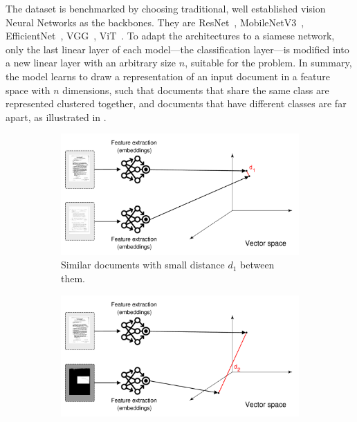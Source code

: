 The dataset is benchmarked by choosing traditional, well established vision Neural Networks as the backbones. They are ResNet~\cite{he_deep_2016}, MobileNetV3~\cite{howard_searching_2019}, EfficientNet~\cite{tan_efficientnet_2019}, VGG~\cite{simonyan_very_2015}, \gls{ViT}~\cite{dosovitskiy_image_2021}. To adapt the architectures to a siamese network, only the last linear layer of each model---the classification layer---is modified into a new linear layer with an arbitrary size $n$, suitable for the problem. In summary, the model learns to draw a representation of an input document in a feature space with $n$ dimensions, such that documents that share the same class are represented clustered together, and documents that have different classes are far apart, as illustrated in .

\begin{figure}[ht!]
    \begin{subfigure}[b]{0.99\textwidth}
        \centering
        \includegraphics[width=\textwidth, trim=15 0 30 0, clip]{images/vector_space_1.pdf}
        \caption{Similar documents with small distance $d_1$ between them.}
        \label{fig:similar_docs}
    \end{subfigure}
    \vfill
    \begin{subfigure}[b]{0.99\textwidth}
        \centering
        \includegraphics[width=\textwidth, trim=15 0 30 0, clip]{images/vector_space_2.pdf}

\end{subfigure}
\end{figure}

